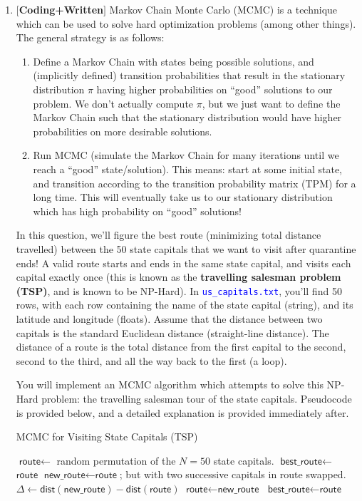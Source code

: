 \documentclass[12pt]{article}
\def\code#1{\textcolor{blue}{\texttt{#1}}}
\renewcommand{\|}{\mid}
\begin{document}
\begin{enumerate}
\item $[$\textbf{Coding+Written}$]$ Markov Chain Monte Carlo (MCMC) is a technique which can be used to solve hard optimization problems (among other things). The general strategy is as follows:
\begin{enumerate}[label=\Roman*.]
    \item Define a Markov Chain with states being possible solutions, and (implicitly defined) transition probabilities that result in the stationary distribution $\pi$ having higher probabilities on ``good'' solutions to our problem. We don't actually compute $\pi$, but we just want to define the Markov Chain such that the stationary distribution would have higher probabilities on more desirable solutions.
    \item Run MCMC (simulate the Markov Chain for many iterations until we reach a ``good'' state/solution). This means: start at some initial state, and transition according to the transition probability matrix (TPM) for a long time. This will eventually take us to our stationary distribution which has high probability on ``good'' solutions!
\end{enumerate}
In this question, we'll figure the best route (minimizing total distance travelled) between the 50 state capitals that we want to visit after quarantine ends! A valid route starts and ends in the same state capital, and visits each capital exactly once (this is known as the \textbf{travelling salesman problem (TSP)}, and is known to be NP-Hard). In \code{us\_capitals.txt}, you'll find 50 rows, with each row containing the name of the state capital (string), and its latitude and longitude (floats). Assume that the distance between two capitals is the standard Euclidean distance (straight-line distance). The distance of a route is the total distance from the first capital to the second, second to the third, and all the way back to the first (a loop).

You will implement an MCMC algorithm which attempts to solve this NP-Hard problem: the travelling salesman tour of the state capitals.  Pseudocode is provided below, and a detailed explanation is provided immediately after. 
\begin{algorithm}
\caption{MCMC for Visiting State Capitals (TSP)}
\begin{algorithmic}[1]
\State $\textsf{route}\gets$ random permutation of the $N=50$ state capitals.
\State $\textsf{best\_route}\gets$ $\textsf{route}$
\State $\textsf{new\_route}\gets\textsf{route}$; but with two successive capitals in \textsf{route} swapped.
\State $\Delta\gets \textsf{dist}(\textsf{new\_route})-\textsf{dist}(\textsf{route})$
\State $\textsf{route}\gets\textsf{new\_route}$
\EndIf
{}
\State $\textsf{best\_route}\gets\textsf{route}$
\EndIf
\EndFor
\end{algorithmic}
\end{algorithm}


\end{enumerate}
\end{document}
